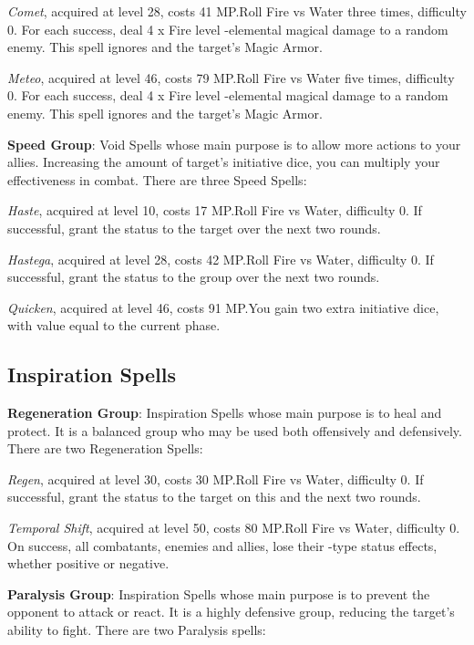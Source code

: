 \begin{multicols}{2}
    \textit{Comet}, acquired at level 28, costs 41 MP.\@{}Roll Fire vs Water three times, difficulty 0. For each success, deal 4 x Fire level -elemental magical damage to a random enemy. This spell ignores  and the target’s Magic Armor.
    
    \textit{Meteo}, acquired at level 46, costs 79 MP.\@{}Roll Fire vs Water five times, difficulty 0. For each success, deal 4 x Fire level -elemental magical damage to a random enemy. This spell ignores  and the target’s Magic Armor.
    
    \textbf{Speed Group}: Void Spells whose main purpose is to allow more actions to your allies. Increasing the amount of target’s initiative dice, you can multiply your effectiveness in combat. There are three Speed Spells:
    
    \textit{Haste}, acquired at level 10, costs 17 MP.\@{}Roll Fire vs Water, difficulty 0. If successful, grant the  status to the target over the next two rounds.
    
    \textit{Hastega}, acquired at level 28, costs 42 MP.\@{}Roll Fire vs Water, difficulty 0. If successful, grant the  status to the group over the next two rounds.
    
    \textit{Quicken}, acquired at level 46, costs 91 MP.\@{}You gain two extra initiative dice, with value equal to the current phase.
    
    \subsection{Inspiration Spells}\label{subsec:time-inspiration}

    \textbf{Regeneration Group}: Inspiration Spells whose main purpose is to heal and protect. It is a balanced group who may be used both offensively and defensively. There are two Regeneration Spells:
    
    \textit{Regen}, acquired at level 30, costs 30 MP.\@{}Roll Fire vs Water, difficulty 0. If successful, grant the  status to the target on this and the next two rounds.
    
    \textit{Temporal Shift}, acquired at level 50, costs 80 MP.\@{}Roll Fire vs Water, difficulty 0. On success, all combatants, enemies and allies, lose their -type status effects, whether positive or negative.
    
    \textbf{Paralysis Group}: Inspiration Spells whose main purpose is to prevent the opponent to attack or react. It is a highly defensive group, reducing the target’s ability to fight. There are two Paralysis spells:
    

\end{multicols}
